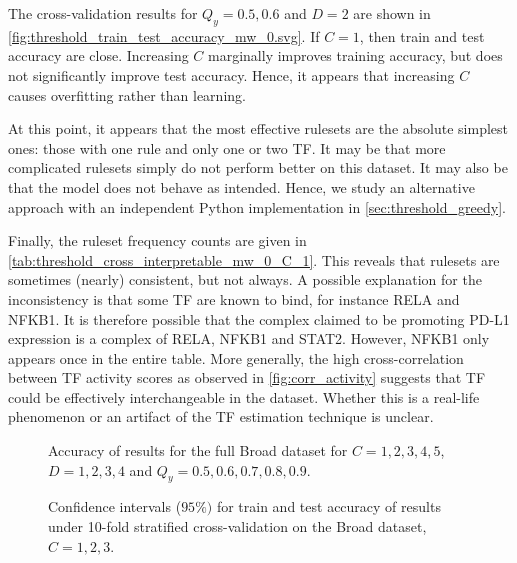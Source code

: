 The cross-validation results for $Q_y=0.5, 0.6$ and $D=2$ are shown in
\autoref{fig:threshold_train_test_accuracy_mw_0.svg}.
If $C=1$, then train and test accuracy are close.
Increasing $C$ marginally improves training accuracy, but does not significantly improve test accuracy.
Hence, it appears that increasing $C$ causes overfitting rather than learning.

At this point, it appears that the most effective rulesets are the absolute simplest ones:
those with one rule and only one or two TF\@.
It may be that more complicated rulesets simply do not perform better on this dataset.
It may also be that the model does not behave as intended.
Hence, we study an alternative approach with an independent Python implementation in \autoref{sec:threshold_greedy}.

Finally, the ruleset frequency counts are given in
\autoref{tab:threshold_cross_interpretable_mw_0_C_1}.
This reveals that rulesets are sometimes (nearly) consistent, but not always.
A possible explanation for the inconsistency is that some TF are known to bind, for instance RELA and NFKB1.
It is therefore possible that the complex claimed to be promoting PD-L1 expression is a complex of
RELA, NFKB1 and STAT2.
However, NFKB1 only appears once in the entire table.
More generally, the high cross-correlation between TF activity scores as observed in \autoref{fig:corr_activity}
suggests that TF could be effectively interchangeable in the dataset.
Whether this is a real-life phenomenon or an artifact of the TF estimation technique is unclear.

\begin{figure}[h]
    \centering
    
    \caption{Accuracy of results for the full Broad dataset for $C=1,2,3,4,5$, $D=1,2,3,4$ and $Q_y=0.5,0.6,0.7,0.8,0.9.$}
    \label{fig:threshold_accuracy_mw_0.svg}
\end{figure}

\begin{figure}[h]
    \centering
    
    \caption{Confidence intervals ($95\%)$ for train and test accuracy of results under 10-fold stratified cross-validation on the Broad dataset, $C=1,2,3.$}
    \label{fig:threshold_train_test_accuracy_mw_0.svg}
\end{figure}


